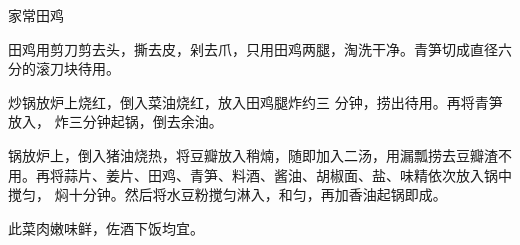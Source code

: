 \begin{recipe}{家常田鸡}

\ingredients


\preparation

\step 田鸡用剪刀剪去头，撕去皮，剁去爪，只用田鸡两腿，淘洗干净。青笋切成直径六
分的滚刀块待用。

炒锅放炉上烧红，倒入菜油烧红，放入田鸡腿炸约三 分钟，捞出待用。再将青笋放入，
炸三分钟起锅，倒去余油。

\step 锅放炉上，倒入猪油烧热，将豆瓣放入稍煵，随即加入二汤，用漏瓢捞去豆瓣渣不
用。再将蒜片、姜片、田鸡、青笋、料酒、酱油、胡椒面、盐、味精依次放入锅中搅匀，
焖十分钟。然后将水豆粉搅匀淋入，和匀，再加香油起锅即成。

\features

此菜肉嫩味鲜，佐酒下饭均宜。

\end{recipe}

